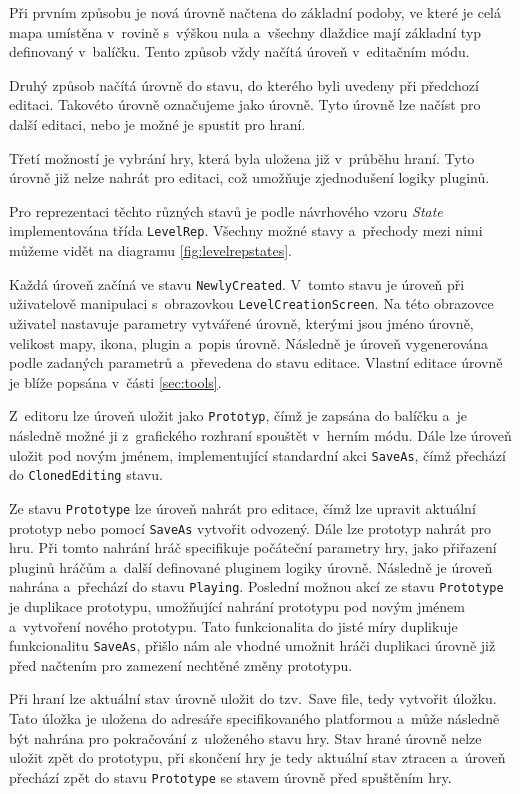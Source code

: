 Při prvním způsobu je nová úrovně načtena do základní podoby, ve které je celá mapa umístěna v~rovině s~výškou nula a~všechny dlaždice mají základní typ definovaný v~balíčku. Tento způsob vždy načítá úroveň v~editačním módu.

Druhý způsob načítá úrovně do stavu, do kterého byli uvedeny při předchozí editaci. Takovéto úrovně označujeme jako  úrovně. Tyto úrovně lze načíst pro další editaci, nebo je možné je spustit pro hraní.

Třetí možností je vybrání hry, která byla uložena již v~průběhu hraní. Tyto úrovně již nelze nahrát pro editaci, což umožňuje zjednodušení logiky pluginů. 

Pro reprezentaci těchto různých stavů je podle návrhového vzoru \textit{State} \citep[str.~305]{book:gangoffour} implementována třída \texttt{LevelRep}. Všechny možné stavy a~přechody mezi nimi můžeme vidět na diagramu \ref{fig:levelrepstates}. 

Každá úroveň začíná ve stavu \texttt{NewlyCreated}. V~tomto stavu je úroveň při uživatelově manipulaci s~obrazovkou \texttt{LevelCreationScreen}. Na této obrazovce uživatel nastavuje parametry vytvářené úrovně, kterými jsou jméno úrovně, velikost mapy, ikona, plugin a~popis úrovně. Následně je úroveň vygenerována podle zadaných parametrů a~převedena do stavu editace. Vlastní editace úrovně je blíže popsána v~části \ref{sec:tools}. 

Z~editoru lze úroveň uložit jako \texttt{Prototyp}, čímž je zapsána do balíčku a~je následně možné ji z~grafického rozhraní spouštět v~herním módu. Dále lze úroveň uložit pod novým jménem, implementující standardní akci \texttt{SaveAs}, čímž přechází do \texttt{ClonedEditing} stavu. 

Ze stavu \texttt{Prototype} lze úroveň nahrát pro editace, čímž lze upravit aktuální prototyp nebo pomocí \texttt{SaveAs} vytvořit odvozený. Dále lze prototyp nahrát pro hru. Při tomto nahrání hráč specifikuje počáteční parametry hry, jako přiřazení pluginů hráčům a~další definované pluginem logiky úrovně. Následně je úroveň nahrána a~přechází do stavu \texttt{Playing}. Poslední možnou akcí ze stavu \texttt{Prototype} je duplikace prototypu, umožňující nahrání prototypu pod novým jménem a~vytvoření nového prototypu. Tato funkcionalita do jisté míry duplikuje funkcionalitu \texttt{SaveAs}, přišlo nám ale vhodné umožnit hráči duplikaci úrovně již před načtením pro zamezení nechtěné změny prototypu.

Při hraní lze aktuální stav úrovně uložit do tzv.~Save file, tedy vytvořit úložku. Tato úložka je uložena do adresáře specifikovaného platformou a~může následně být nahrána pro pokračování z~uloženého stavu hry. Stav hrané úrovně nelze uložit zpět do prototypu, při skončení hry je tedy aktuální stav ztracen a~úroveň přechází zpět do stavu \texttt{Prototype} se stavem úrovně před spuštěním hry.

